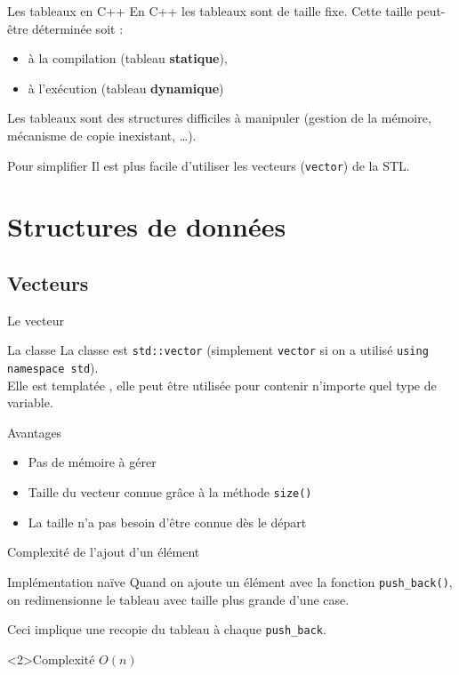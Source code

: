 \begin{frame}{Les tableaux en C++}
En C++ les tableaux sont de taille fixe. Cette taille peut-être déterminée soit :
\begin{itemize}
    \item à la compilation (tableau \textbf{statique}),
    \item à l'exécution (tableau \textbf{dynamique})
\end{itemize}
Les tableaux sont des structures difficiles à manipuler (gestion de la mémoire, mécanisme de copie inexistant, \dots).

\begin{exampleblock}{Pour simplifier}
Il est plus facile d'utiliser les vecteurs (\texttt{vector}) de la STL.
\end{exampleblock}

\end{frame}

\section{Structures de données}

\subsection{Vecteurs}


\begin{frame}{Le vecteur}
    \begin{block}{La classe}
    La classe est \texttt{std::vector} (simplement \texttt{vector} si on a utilisé \texttt{using namespace std}).\\
    Elle est \og templatée \fg, elle peut être utilisée pour contenir n'importe quel type de variable.
  \end{block}

\begin{exampleblock}{Avantages}
  \begin{itemize}
  \item Pas de mémoire à gérer
  \item Taille du vecteur connue grâce à la méthode \texttt{size()}
  \item La taille n'a pas besoin d'être connue dès le départ
  \end{itemize}
\end{exampleblock}
\end{frame}

\begin{frame}{Complexité de l'ajout d'un élément}

\begin{block}{Implémentation naïve}
    Quand on ajoute un élément avec la fonction \texttt{push_back()}, on redimensionne le tableau avec taille plus grande d'une case.
\end{block}

Ceci implique une recopie du tableau à chaque \texttt{push_back}.

\begin{exampleblock}<2>{Complexité}
    \centering
    $O(n)$
\end{exampleblock}
\end{frame}

